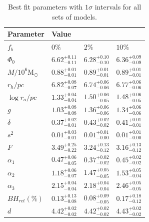 \begin{table}
	\centering
	\caption{Best fit parameters with $1\sigma$ intervals for all sets of models.}
	\begin{tabular}{l l l l}

		\hline
		Parameter                 & Value                                                                    \\
		\hline
		$f_b$                     & $0\%$                  & $2\%$                  & $10\%$                 \\
		$\Phi_0$                  & $6.62^{+0.11}_{-0.11}$ & $6.28^{+0.10}_{-0.10}$ & $6.36^{+0.09}_{-0.09}$ \\
		$M/10^6 \mathrm{M}_\odot$ & $0.88^{+0.01}_{-0.01}$ & $0.89^{+0.01}_{-0.01}$ & $0.89^{+0.01}_{-0.01}$ \\
		$r_h / pc$                & $6.82^{+0.08}_{-0.07}$ & $6.74^{+0.06}_{-0.06}$ & $6.77^{+0.06}_{-0.06}$ \\
		$\log{r_a / pc}$          & $1.33^{+0.04}_{-0.04}$ & $1.50^{+0.06}_{-0.05}$ & $1.48^{+0.06}_{-0.05}$ \\
		$g$                       & $1.03^{+0.08}_{-0.08}$ & $1.36^{+0.06}_{-0.06}$ & $1.34^{+0.06}_{-0.06}$ \\
		$\delta$                  & $0.37^{+0.02}_{-0.01}$ & $0.43^{+0.02}_{-0.02}$ & $0.41^{+0.01}_{-0.01}$ \\
		$s^2$                     & $0.01^{+0.03}_{-0.01}$ & $0.01^{+0.01}_{-0.00}$ & $0.01^{+0.01}_{-0.00}$ \\
		$F$                       & $3.49^{+0.25}_{-0.22}$ & $3.24^{+0.13}_{-0.12}$ & $3.16^{+0.13}_{-0.12}$ \\
		$\alpha_1$                & $0.47^{+0.06}_{-0.05}$ & $0.37^{+0.02}_{-0.02}$ & $0.45^{+0.02}_{-0.02}$ \\
		$\alpha_2$                & $1.18^{+0.06}_{-0.07}$ & $1.47^{+0.05}_{-0.05}$ & $1.53^{+0.05}_{-0.04}$ \\
		$\alpha_3$                & $2.15^{+0.04}_{-0.04}$ & $2.18^{+0.04}_{-0.04}$ & $2.46^{+0.05}_{-0.05}$ \\
		$BH_{ret} (\%)$           & $0.13^{+0.13}_{-0.08}$ & $0.08^{+0.09}_{-0.05}$ & $0.17^{+0.18}_{-0.12}$ \\
		$d$                       & $4.42^{+0.02}_{-0.02}$ & $4.42^{+0.02}_{-0.02}$ & $4.43^{+0.02}_{-0.02}$ \\
		\hline
	\end{tabular}
	\label{tab:parameters_all}
\end{table}







